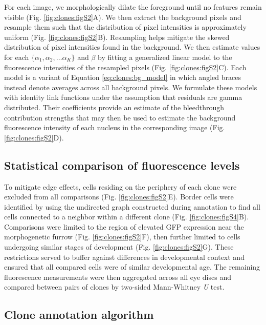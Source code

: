 For each image, we morphologically dilate the foreground until no features remain visible (Fig. \ref{fig:clones:figS2}A). We then extract the background pixels and resample them such that the distribution of pixel intensities is approximately uniform (Fig. \ref{fig:clones:figS2}B). Resampling helps mitigate the skewed distribution of pixel intensities found in the background. We then estimate values for each $\{\alpha_1, \alpha_2, \ldots \alpha_K\}$ and $\beta$ by fitting a generalized linear model to the fluorescence intensities of the resampled pixels (Fig. \ref{fig:clones:figS2}C). Each model is a variant of Equation \ref{eq:clones:bg_model} in which angled braces instead denote averages across all background pixels. We formulate these models with identity link functions under the assumption that residuals are gamma distributed. Their coefficients provide an estimate of the bleedthrough contribution strengths that may then be used to estimate the background fluorescence intensity of each nucleus in the corresponding image (Fig. \ref{fig:clones:figS2}D).

\subsection{Statistical comparison of fluorescence levels}
\label{appendix:methods:clones:comparison}

To mitigate edge effects, cells residing on the periphery of each clone were excluded from all comparisons (Fig. \ref{fig:clones:figS2}E). Border cells were identified by using the undirected graph constructed during annotation to find all cells connected to a neighbor within a different clone (Fig. \ref{fig:clones:figS4}B). Comparisons were limited to the region of elevated GFP expression near the morphogenetic furrow (Fig. \ref{fig:clones:figS2}F), then further limited to cells undergoing similar stages of development (Fig. \ref{fig:clones:figS2}G). These restrictions served to buffer against differences in developmental context and ensured that all compared cells were of similar developmental age. The remaining fluorescence measurements were then aggregated across all eye discs and compared between pairs of clones by two-sided Mann-Whitney \textit{U} test.

\subsection{Clone annotation algorithm} \label{clones:methods:annotation}
\label{appendix:methods:clones:annotation}

